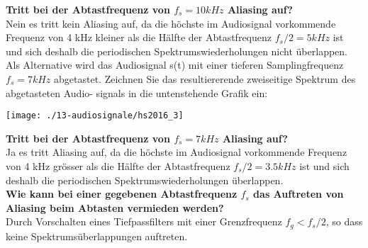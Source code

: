 \textbf{Tritt bei der Abtastfrequenz von $f_s = 10 kHz$ Aliasing auf?}\\
Nein es tritt kein Aliasing auf, da die höchste im Audiosignal vorkommende Frequenz von 4 kHz kleiner als die Hälfte der Abtastfrequenz $f_s/2 = 5 kHz$ ist und sich deshalb die periodischen Spektrumswiederholungen nicht überlappen.\\

Als Alternative wird das Audiosignal s(t) mit einer tieferen Samplingfrequenz $f_s = 7 kHz$ abgetastet. Zeichnen Sie das resultiererende zweiseitige Spektrum des abgetasteten Audio-
signals in die untenstehende Grafik ein:
\begin{center}
    \vspace{-8pt}
    \texttt{[image: ./13-audiosignale/hs2016\_3]}
    \vspace{-8pt}
\end{center}

\textbf{Tritt bei der Abtastfrequenz von $f_s = 7 kHz$ Aliasing auf?}\\
Ja es tritt Aliasing auf, da die höchste im Audiosignal vorkommende Frequenz von 4 kHz grösser als die Hälfte der Abtastfrequenz $f_s/2 = 3.5 kHz$ ist und sich deshalb die
periodischen Spektrumswiederholungen überlappen.\\

\textbf{Wie kann bei einer gegebenen Abtastfrequenz $f_s$ das Auftreten von Aliasing beim Abtasten vermieden werden?}\\
Durch Vorschalten eines Tiefpassfilters mit einer Grenzfrequenz $f_g < f_s/2$, so dass keine Spektrumsüberlappungen auftreten.